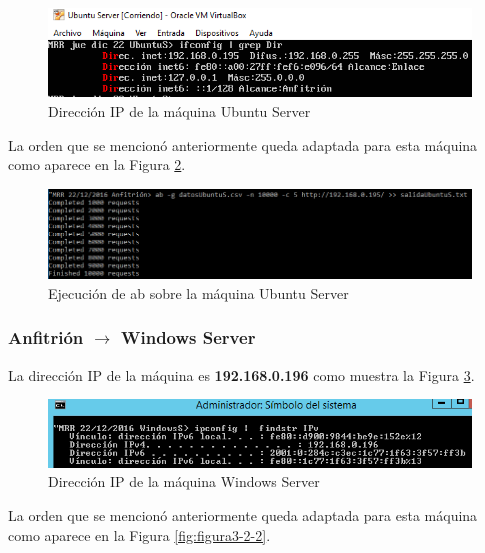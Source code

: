 \begin{figure}[H] %
	\centering
	\includegraphics[scale=0.9]{figuras/ejercicio3/anf-ubuntu/figura3-1-1.png} 
	\caption{Dirección IP de la máquina Ubuntu Server} 
	\label{fig:figura3-1-1}
\end{figure}

La orden que se mencionó anteriormente queda adaptada para esta máquina como aparece en la Figura \ref{fig:figura3-1-2}.

\begin{figure}[H] %
	\centering
	\includegraphics[scale=0.7]{figuras/ejercicio3/anf-ubuntu/figura3-1-2.png} 
	\caption{Ejecución de ab sobre la máquina Ubuntu Server} 
	\label{fig:figura3-1-2}
\end{figure}

\subsubsection{Anfitrión $ \rightarrow $ Windows Server }
La dirección IP de la máquina es \textbf{192.168.0.196} como muestra la Figura \ref{fig:figura3-2-1}.

\begin{figure}[H] %
	\centering
	\includegraphics[scale=0.9]{figuras/ejercicio3/anf-winserver/figura3-2-1.png} 
	\caption{Dirección IP de la máquina Windows Server} 
	\label{fig:figura3-2-1}
\end{figure}

La orden que se mencionó anteriormente queda adaptada para esta máquina como aparece en la Figura \ref{fig:figura3-2-2}.

